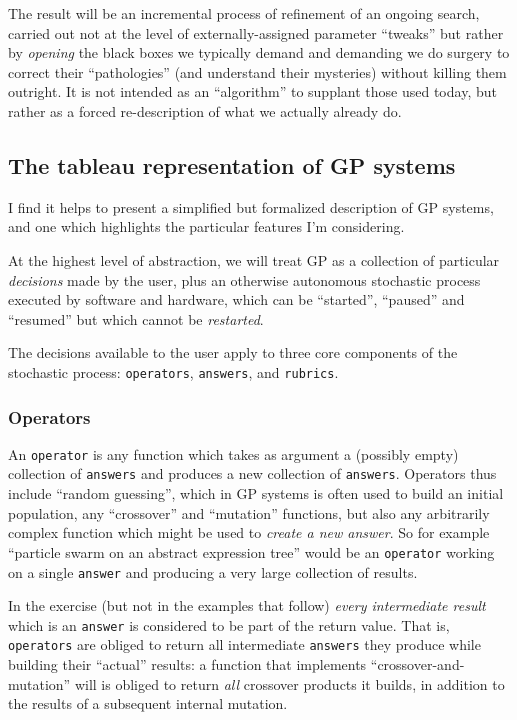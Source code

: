 The result will be an incremental process of refinement of an ongoing search, carried out not at the level of externally-assigned parameter ``tweaks'' but rather by \emph{opening} the black boxes we typically demand and demanding we do surgery to correct their ``pathologies'' (and understand their mysteries) without killing them outright. It is not intended as an ``algorithm'' to supplant those used today, but rather as a forced re-description of what we actually already do.

\subsection{The tableau representation of GP systems}\hypertarget{the-tableau-representation-of-gp-systems}{}\label{the-tableau-representation-of-gp-systems}

I find it helps to present a simplified but formalized description of GP systems, and one which highlights the particular features I'm considering.

At the highest level of abstraction, we will treat GP as a collection of particular \emph{decisions} made by the user, plus an otherwise autonomous stochastic process executed by software and hardware, which can be ``started'', ``paused'' and ``resumed'' but which cannot be \emph{restarted}.

The decisions available to the user apply to three core components of the stochastic process: {\tt operators}, {\tt answers}, and {\tt rubrics}.

\subsubsection{Operators}\hypertarget{operators}{}\label{operators}

An {\tt operator} is any function which takes as argument a (possibly empty) collection of {\tt answers} and produces a new collection of {\tt answers}. Operators thus include ``random guessing'', which in GP systems is often used to build an initial population, any ``crossover'' and ``mutation'' functions, but also any arbitrarily complex function which might be used to \emph{create a new answer}. So for example ``particle swarm on an abstract expression tree'' would be an {\tt operator} working on a single {\tt answer} and producing a very large collection of results.

In the exercise (but not in the examples that follow) \emph{every intermediate result} which is an {\tt answer} is considered to be part of the return value. That is, {\tt operators} are obliged to return all intermediate {\tt answers} they produce while building their ``actual'' results: a function that implements ``crossover-and-mutation'' will is obliged to return \emph{all} crossover products it builds, in addition to the results of a subsequent internal mutation.


